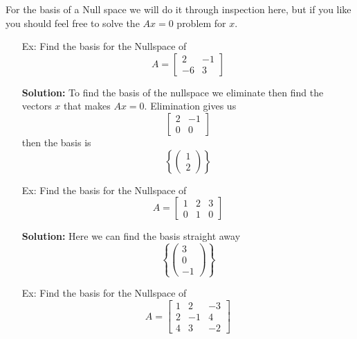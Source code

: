 \documentclass[reqno]{amsart}
\theoremstyle{definition}
\begin{document}
For the basis of a Null space we will do it through inspection here, but if you like you
should feel free to solve the $Ax=0$ problem for $x$.

\begin{enumerate}

\item[Ex:  ]  Find the basis for the Nullspace of
%
\begin{equation*}
A = \begin{bmatrix}
2 & -1\\
-6 & 3
\end{bmatrix}
\end{equation*}

\textbf{Solution:  }
To find the basis of the nullspace we eliminate then find the vectors $x$ that makes $Ax = 0$.
Elimination gives us
%
\begin{equation*}
\begin{bmatrix}
2 & -1\\
0 & 0
\end{bmatrix}
\end{equation*}
%
then the basis is
%
\begin{equation*}
\left\lbrace \begin{pmatrix}
1\\
2
\end{pmatrix}\right\rbrace
\end{equation*}

\item[Ex:  ]  Find the basis for the Nullspace of
%
\begin{equation*}
A = \begin{bmatrix}
1 & 2 & 3\\
0 & 1 & 0
\end{bmatrix}
\end{equation*}

\textbf{Solution:  }
Here we can find the basis straight away
%
\begin{equation*}
\left\lbrace \begin{pmatrix}
3\\
0\\
-1
\end{pmatrix}\right\rbrace
\end{equation*}

\item[Ex:  ]  Find the basis for the Nullspace of
%
\begin{equation*}
A = \begin{bmatrix}
1 & 2 & -3\\
2 & -1 & 4\\
4 & 3 & -2
\end{bmatrix}
\end{equation*}


\end{enumerate}
\end{document}

